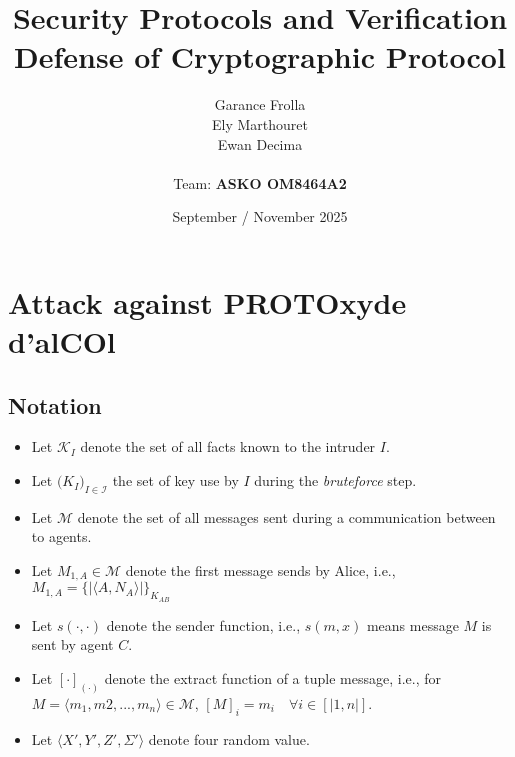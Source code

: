 \documentclass[11pt]{article}
\begin{document}
    \title{
            { \textbf{Security Protocols and Verification}} \\[1ex]
        {\small Defense of Cryptographic Protocol}
    }


    \author{
        Garance Frolla \\
        Ely Marthouret \\
        Ewan Decima\\ \\
        Team: \textbf{ASKO OM8464A2}
    }

    \date{September / November 2025}


    \maketitle
    \tableofcontents
    \newpage

    \section{Attack against PROTOxyde d'alCOl}

    \subsection{Notation}
    \begin{itemize}
        \item Let $\mathcal{K}_I$ denote the set of all facts known to the intruder $I$.
        \item Let $\bigl(K_I\bigr)_{I \in \mathcal{I}}$ the set of key use by $I$ during the \textit{bruteforce} step.
        \item Let $\mathcal{M}$ denote the set of all  messages sent during a communication between to agents.
        \item Let $M_{1,A} \in \mathcal{M}$ denote the first message sends by Alice, i.e., $M_{1,A} = \{|\langle A,N_A \rangle|\}_{K_{AB}}$
        \item Let $s(\cdot, \cdot)$ denote the sender function, i.e., $s(m,x)$ means message $M$ is sent by agent $C$.
        \item Let $[\cdot]_{(\cdot)}$ denote the extract function of a tuple message, i.e., for
                $ M = \langle m_1, m2, ..., m_n \rangle \in \mathcal{M}$, $[M]_i = m_i \quad \forall i \in [|1,n|]$.
        \item Let $\langle X',Y',Z', \Sigma' \rangle$ denote four random value.
    \end{itemize}
    
\end{document}
